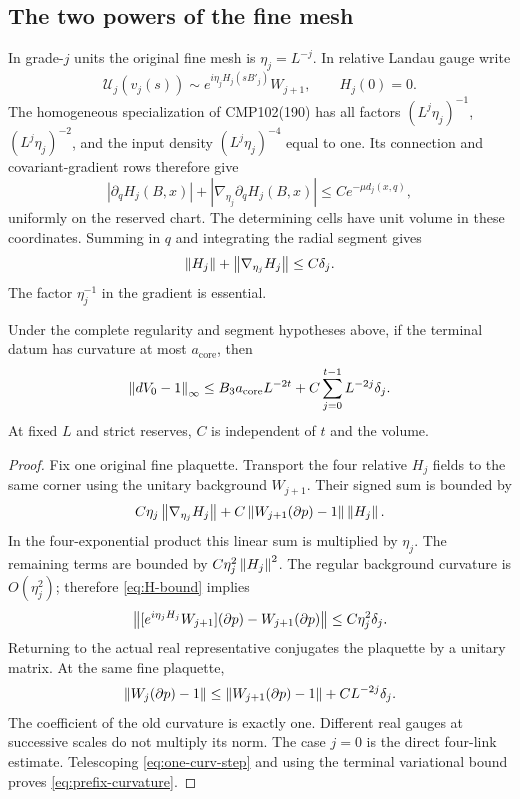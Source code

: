 \subsection{The two powers of the fine mesh}

In grade-$j$ units the original fine mesh is $\eta_j=L^{-j}$. In relative Landau gauge write
\[
 \mathcal U_j(v_j(s))\sim
       e^{i\eta_j H_j(sB'_j)}W_{j+1},\qquad H_j(0)=0.
\]
The homogeneous specialization of CMP102(190) has all factors $(L^j\eta_j)^{-1}$, $(L^j\eta_j)^{-2}$, and the input density $(L^j\eta_j)^{-4}$ equal to one. Its connection and covariant-gradient rows therefore give
\begin{equation}\label{eq:minimum-row}
 |\partial_qH_j(B,x)|+|\nabla_{\eta_j}\partial_qH_j(B,x)|
 \le Ce^{-\mu d_j(x,q)},
\end{equation}
uniformly on the reserved chart. The determining cells have unit volume in these coordinates. Summing in $q$ and integrating the radial segment gives
\begin{equation}\label{eq:H-bound}
 \left\lVert H_j\right\rVert+\left\lVert \nabla_{\eta_j}H_j\right\rVert\le C\delta_j.
\end{equation}
The factor $\eta_j^{-1}$ in the gradient is essential.

\begin{theorem}\label{thm:real-prefix}
Under the complete regularity and segment hypotheses above, if the terminal datum has curvature at most $a_{\mathrm{core}}$, then
\begin{equation}\label{eq:prefix-curvature}
 \left\lVert dV_0-1\right\rVert_\infty
 \le B_3a_{\mathrm{core}}L^{-2t}
       +C\sum_{j=0}^{t-1}L^{-2j}\delta_j.
\end{equation}
At fixed $L$ and strict reserves, $C$ is independent of $t$ and the volume.
\end{theorem}

\begin{proof}
Fix one original fine plaquette. Transport the four relative $H_j$ fields to the same corner using the unitary background $W_{j+1}$. Their signed sum is bounded by
\[
 C\eta_j\left\lVert \nabla_{\eta_j}H_j\right\rVert
  +C\left\lVert W_{j+1}(\partial p)-1\right\rVert\left\lVert H_j\right\rVert.
\]
In the four-exponential product this linear sum is multiplied by $\eta_j$. The remaining terms are bounded by $C\eta_j^2\left\lVert H_j\right\rVert^2$. The regular background curvature is $O(\eta_j^2)$; therefore \eqref{eq:H-bound} implies
\[
 \left\lVert [e^{i\eta_jH_j}W_{j+1}](\partial p)
                         -W_{j+1}(\partial p)\right\rVert
 \le C\eta_j^2\delta_j.
\]
Returning to the actual real representative conjugates the plaquette by a unitary matrix. At the same fine plaquette,
\begin{equation}\label{eq:one-curv-step}
 \left\lVert W_j(\partial p)-1\right\rVert
 \le\left\lVert W_{j+1}(\partial p)-1\right\rVert+CL^{-2j}\delta_j.
\end{equation}
The coefficient of the old curvature is exactly one. Different real gauges at successive scales do not multiply its norm. The case $j=0$ is the direct four-link estimate. Telescoping \eqref{eq:one-curv-step} and using the terminal variational bound proves \eqref{eq:prefix-curvature}.
\end{proof}

